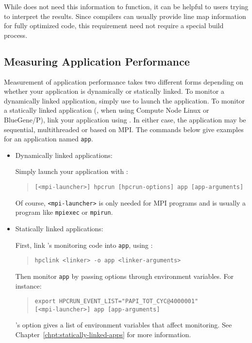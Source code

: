 \documentclass[11pt,letterpaper]{report}
\begin{document}
While \HPCToolkit{} does not need this information to function, it can be helpful to users trying to interpret the results.
Since compilers can usually provide line map information for fully optimized code, this requirement need not require a special build process.



\subsection{Measuring Application Performance}
\label{chpt:quickstart:tour:measurement}

Measurement of application performance takes two different forms depending on whether your application is dynamically or statically linked.
To monitor a dynamically linked application, simply use \hpcrun{} to launch the application.
To monitor a statically linked application (\eg{}, when using Compute Node Linux or BlueGene/P), link your application using \hpclink{}.
In either case, the application may be sequential, multithreaded or based on MPI.
The commands below give examples for an application named \texttt{app}.
%
\begin{itemize}

\item Dynamically linked applications:\hfill

Simply launch your application with \hpcrun{}:
\begin{quote}
  \verb|[<mpi-launcher>] hpcrun [hpcrun-options] app [app-arguments]|
\end{quote}
Of course, \texttt{<mpi-launcher>} is only needed for MPI programs and is usually a program like \texttt{mpiexec} or \texttt{mpirun}.

\item Statically linked applications:\hfill

First, link \hpcrun{}'s monitoring code into \texttt{app}, using \hpclink{}:
\begin{quote}
  \verb|hpclink <linker> -o app <linker-arguments>|
\end{quote}

Then monitor \texttt{app} by passing \hpcrun{} options through environment variables.
For instance:
\begin{quote}
\begin{verbatim}
export HPCRUN_EVENT_LIST="PAPI_TOT_CYC@4000001"
[<mpi-launcher>] app [app-arguments]
\end{verbatim}
\end{quote}
\hpclink{}'s  option gives a list of environment variables that affect monitoring.
See Chapter~\ref{chpt:statically-linked-apps} for more information.

\end{itemize}
\end{document}
